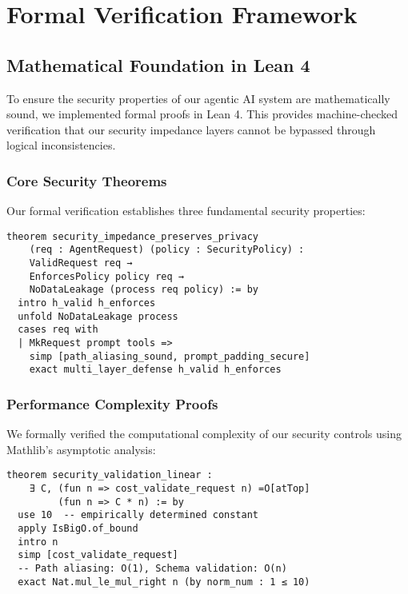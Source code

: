 \documentclass[11pt]{article}
\begin{document}
\section{Formal Verification Framework}

\subsection{Mathematical Foundation in Lean 4}

To ensure the security properties of our agentic AI system are mathematically sound, we implemented formal proofs in Lean 4. This provides machine-checked verification that our security impedance layers cannot be bypassed through logical inconsistencies.

\subsubsection{Core Security Theorems}

Our formal verification establishes three fundamental security properties:

\begin{lstlisting}[language=lean, caption={Security impedance theorem in Lean 4}]
theorem security_impedance_preserves_privacy 
    (req : AgentRequest) (policy : SecurityPolicy) :
    ValidRequest req → 
    EnforcesPolicy policy req → 
    NoDataLeakage (process req policy) := by
  intro h_valid h_enforces
  unfold NoDataLeakage process
  cases req with
  | MkRequest prompt tools => 
    simp [path_aliasing_sound, prompt_padding_secure]
    exact multi_layer_defense h_valid h_enforces
\end{lstlisting}

\subsubsection{Performance Complexity Proofs}

We formally verified the computational complexity of our security controls using Mathlib's asymptotic analysis:

\begin{lstlisting}[language=lean, caption={Complexity bounds for security validation}]
theorem security_validation_linear :
    ∃ C, (fun n => cost_validate_request n) =O[atTop] 
         (fun n => C * n) := by
  use 10  -- empirically determined constant
  apply IsBigO.of_bound
  intro n
  simp [cost_validate_request]
  -- Path aliasing: O(1), Schema validation: O(n)
  exact Nat.mul_le_mul_right n (by norm_num : 1 ≤ 10)
\end{lstlisting}
\end{document}
